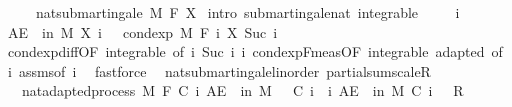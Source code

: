 \begin{isabellebody}
\ \ \ \ \ {\isachardoublequoteopen}nat{\isacharunderscore}{\kern0pt}submartingale\ M\ F\ X{\isachardoublequoteclose}\isanewline
%
\isadelimproof
%
\endisadelimproof
%
\isatagproof
{}\isamarkupfalse%
\ {\isacharparenleft}{\kern0pt}intro\ submartingale{\isacharunderscore}{\kern0pt}nat\ integrable{\isacharparenright}{\kern0pt}\ \isanewline
\ \ \isamarkupfalse%
\ i\ \isanewline
\ \ \isamarkupfalse%
\ {\isachardoublequoteopen}AE\ {\isasymxi}\ in\ M{\isachardot}{\kern0pt}\ X\ i\ {\isasymxi}\ {\isasymle}\ cond{\isacharunderscore}{\kern0pt}exp\ M\ {\isacharparenleft}{\kern0pt}F\ i{\isacharparenright}{\kern0pt}\ {\isacharparenleft}{\kern0pt}X\ {\isacharparenleft}{\kern0pt}Suc\ i{\isacharparenright}{\kern0pt}{\isacharparenright}{\kern0pt}\ {\isasymxi}{\isachardoublequoteclose}\ \isamarkupfalse%
\ cond{\isacharunderscore}{\kern0pt}exp{\isacharunderscore}{\kern0pt}diff{\isacharbrackleft}{\kern0pt}OF\ integrable{\isacharparenleft}{\kern0pt}{}{\isacharcomma}{\kern0pt}{}{\isacharparenright}{\kern0pt}{\isacharcomma}{\kern0pt}\ of\ i\ {\isachardoublequoteopen}Suc\ i{\isachardoublequoteclose}\ i{\isacharbrackright}{\kern0pt}\ cond{\isacharunderscore}{\kern0pt}exp{\isacharunderscore}{\kern0pt}F{\isacharunderscore}{\kern0pt}meas{\isacharbrackleft}{\kern0pt}OF\ integrable\ adapted{\isacharcomma}{\kern0pt}\ of\ i{\isacharbrackright}{\kern0pt}\ assms{\isacharparenleft}{\kern0pt}{}{\isacharparenright}{\kern0pt}{\isacharbrackleft}{\kern0pt}of\ i{\isacharbrackright}{\kern0pt}\ \isamarkupfalse%
\ fastforce\isanewline
{}\isamarkupfalse%
%
\endisatagproof
{\isafoldproof}%
%
\isadelimproof
\isanewline
%
\endisadelimproof
\isanewline
{}\isamarkupfalse%
\ {\isacharparenleft}{\kern0pt}\ nat{\isacharunderscore}{\kern0pt}submartingale{\isacharunderscore}{\kern0pt}linorder{\isacharparenright}{\kern0pt}\ partial{\isacharunderscore}{\kern0pt}sum{\isacharunderscore}{\kern0pt}scaleR{\isacharcolon}{\kern0pt}\isanewline
\ \ \ {\isachardoublequoteopen}nat{\isacharunderscore}{\kern0pt}adapted{\isacharunderscore}{\kern0pt}process\ M\ F\ C{\isachardoublequoteclose}\ {\isachardoublequoteopen}{\isasymAnd}i{\isachardot}{\kern0pt}\ AE\ {\isasymxi}\ in\ M{\isachardot}{\kern0pt}\ {}\ {\isasymle}\ C\ i\ {\isasymxi}{\isachardoublequoteclose}\ {\isachardoublequoteopen}{\isasymAnd}i{\isachardot}{\kern0pt}\ AE\ {\isasymxi}\ in\ M{\isachardot}{\kern0pt}\ C\ i\ {\isasymxi}\ {\isasymle}\ R{\isachardoublequoteclose}\isanewline

\end{isabellebody}

